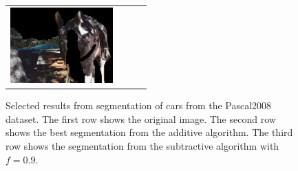 \documentclass[10pt,twocolumn,letterpaper]{article}
\begin{document}
\begin{figure}[p]
\begin{tabular}{ p{4cm} p{4cm} p{4cm} p{4cm} }
\includegraphics[width=3.95cm]{figures/add_res/horse/2008_002509.jpg_3_good.jpg.eps} \\
\end{tabular}
\caption{Selected results from segmentation of cars from the Pascal2008
dataset.  The first row shows the original image.  The second row shows
the best segmentation from the additive algorithm.  The third row shows
the segmentation from the subtractive algorithm with $f=0.9$.}
\label{fig:good_results_car}
\end{figure}
\end{document}
